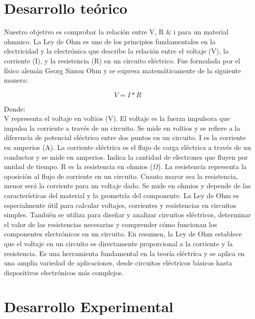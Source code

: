 \documentclass{article}
\begin{document}

\begin{multicols}{2}
\section{Desarrollo teórico}\label{Desarrollo Teorico}                              	%
Nuestro objetivo es comprobar la relación entre V, R \& i para un material ohmnico. 
\cite{Fluke}
La Ley de Ohm es uno de los principios fundamentales en la electricidad y la electrónica que describe la relación entre el voltaje (V),
 la corriente (I), y la resistencia (R) en un circuito eléctrico. Fue formulada por el físico alemán Georg Simon Ohm y se expresa matemáticamente de la siguiente manera:

 \begin{equation}
    V = I * R 
 \end{equation}

 Donde:
\\
V representa el voltaje en voltios (V). El voltaje es la fuerza impulsora que impulsa la corriente a través de un circuito. Se mide en voltios y se refiere a la diferencia de potencial eléctrico entre dos puntos en un circuito.
I es la corriente en amperios (A). La corriente eléctrica es el flujo de carga eléctrica a través de un conductor y se mide en amperios. Indica la cantidad de electrones que fluyen por unidad de tiempo.
R es la resistencia en ohmios ($\Omega$). La resistencia representa la oposición al flujo de corriente en un circuito. Cuanto mayor sea la resistencia, menor será la corriente para un voltaje dado. Se mide en ohmios y depende de las características del material y la geometría del componente.
La Ley de Ohm es especialmente útil para calcular voltajes, corrientes y resistencias en circuitos simples. También se utiliza para diseñar y analizar circuitos eléctricos, determinar el valor de las resistencias necesarias y comprender cómo funcionan los componentes electrónicos en un circuito.
En resumen, la Ley de Ohm establece que el voltaje en un circuito es directamente proporcional a la corriente y la resistencia. Es una herramienta fundamental en la teoría eléctrica y se aplica en una amplia variedad de aplicaciones, desde circuitos eléctricos básicos hasta dispositivos electrónicos más complejos.
\section{Desarrollo Experimental}\label{Desarrollo experimental}				%

\end{multicols}
\end{document}
